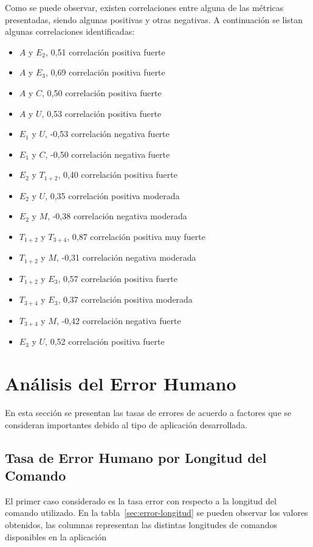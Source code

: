 Como se puede observar, existen correlaciones entre alguna de las m\'etricas presentadas, 
siendo algunas positivas y otras negativas. A continuaci\'on se listan algunas correlaciones identificadas:

\begin{itemize}
    \item $A$ y $E_2$, 0,51 correlaci\'on positiva fuerte
    \item $A$ y $E_3$, 0,69 correlaci\'on positiva fuerte
    \item $A$ y $C$, 0,50 correlaci\'on positiva fuerte
    \item $A$ y $U$, 0,53 correlaci\'on positiva fuerte
    \item $E_1$ y $U$, -0,53 correlaci\'on negativa fuerte
    \item $E_1$ y $C$, -0,50 correlaci\'on negativa fuerte
    \item $E_2$ y $T_{1+2}$, 0,40 correlaci\'on positiva fuerte
    \item $E_2$ y $U$, 0,35 correlaci\'on positiva moderada
    \item $E_2$ y $M$, -0,38 correlaci\'on negativa moderada
    \item $T_{1+2}$ y $T_{3+4}$, 0,87 correlaci\'on positiva muy fuerte
    \item $T_{1+2}$ y $M$, -0,31 correlaci\'on negativa moderada
    \item $T_{1+2}$ y $E_3$, 0,57 correlaci\'on positiva fuerte
    \item $T_{3+4}$ y $E_3$, 0,37 correlaci\'on positiva moderada
    \item $T_{3+4}$ y $M$, -0,42 correlaci\'on negativa fuerte
    \item $E_3$ y $U$, 0,52 correlaci\'on positiva fuerte
\end{itemize}


\section{An\'alisis del Error Humano}
\label{sec:resultados-error-humano}

En esta secci\'on se presentan las tasas de errores de acuerdo a factores que se consideran importantes debido
al tipo de aplicaci\'on desarrollada. 

\subsection{Tasa de Error Humano por Longitud del Comando}
El primer caso considerado es la tasa error con respecto a la longitud del comando
utilizado. En la tabla~\ref{sec:error-longitud} se pueden observar los valores obtenidos, las columnas
representan las distintas longitudes de comandos disponibles en la aplicaci\'on


